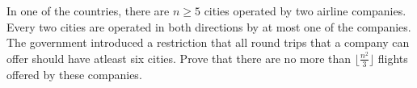 In one of the countries, there are $n \geq 5$ cities operated by two airline companies. Every two cities are operated in both directions by at most one of the companies. The government introduced a restriction that all round trips that a company can offer should have atleast six cities. Prove that there are no more than $\lfloor \tfrac{n^2}{3} \rfloor$ flights offered by these companies.